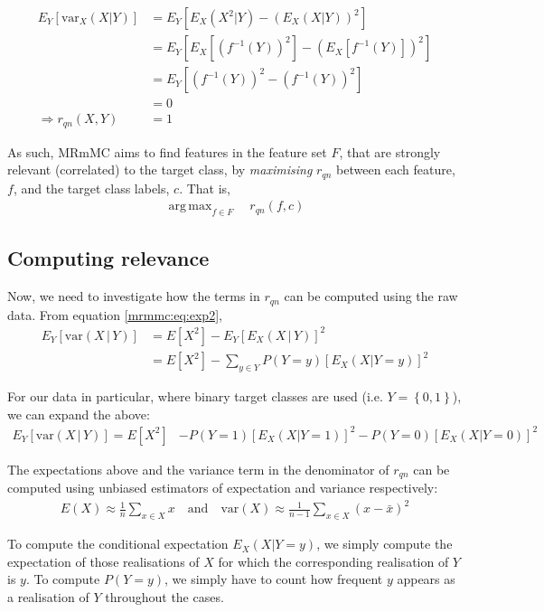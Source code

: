 \documentclass[12pt, twoside, a4paper]{report}
\def\var{\text{var}}
\DeclareMathOperator*{\argmax}{arg\,max}
\begin{document}
\begin{align*}
E_Y[\var_X(X|Y)]
&= E_Y [E_X(X^2|Y)-\left( E_X(X|Y) \right)^2 ] \\
&= E_Y \left[E_X\left[\left(f^{-1}(Y)\right)^2\right]-\left( E_X\left[f^{-1}(Y) \right] \right)^2 \right] \\
&= E_Y \left[\left(f^{-1}(Y)\right)^2 -\left( f^{-1}(Y)\right)^2 \right] \\
&= 0 \\
\Rightarrow r_{qn} (X, Y) &= 1
\end{align*}

As such, MRmMC aims to find features in the feature set $F$, that are strongly relevant (correlated) to the target class, by \textit{maximising} $r_{qn}$ between each feature, $f$, and the target class labels, $c$. That is,
\begin{align*}
\argmax_{f \in F} \quad r_{qn}(f, c)
\end{align*}

\subsection{Computing relevance}
Now, we need to investigate how the terms in $r_{qn}$ can be computed using the raw data. From equation \ref{mrmmc:eq:exp2},
\begin{align*}
E_Y [ \var(X \, | \, Y) ]
&= E[X^2] - E_Y [ E_X(X\,|\,Y) ] ^2 \\
&= E[X^2] - \sum_{y \in Y} P(Y=y) \left[ E_X(X|Y=y) \right]^2 
\end{align*}

For our data in particular, where binary target classes are used (i.e. $Y= \left\lbrace 0,1 \right\rbrace$), we can expand the above:
\begin{align*}
E_Y [ \var(X \, | \, Y) ]
= E[X^2] &- P(Y=1) \left[ E_X(X|Y=1) \right]^2 - P(Y=0) \left[ E_X(X|Y=0) \right]^2 
\end{align*}

The expectations above and the variance term in the denominator of $r_{qn}$ can be computed using unbiased estimators of expectation and variance respectively:
\begin{align*}
E(X) \approx \frac{1}{n} \sum_{x \in X} x \quad \text{and} \quad \var(X) \approx \frac{1}{n-1} \sum_{x \in X} (x- \bar{x})^2
\end{align*}

To compute the conditional expectation $E_X(X|Y=y)$, we simply compute the expectation of those realisations of $X$ for which the corresponding realisation of $Y$ is $y$. To compute $P(Y=y)$, we simply have to count how frequent $y$ appears as a realisation of $Y$ throughout the cases.
\end{document}
